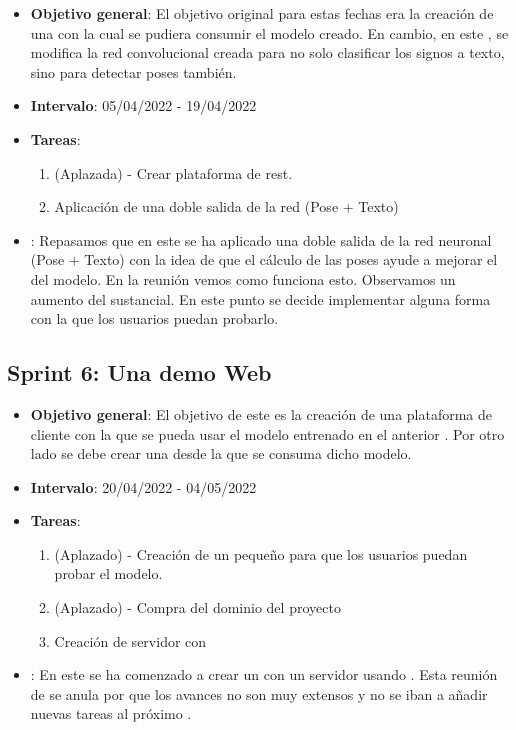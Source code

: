 \begin{itemize}
  \item  \textbf{Objetivo general}: El objetivo original para estas fechas era la creación de una   con la cual se pudiera consumir el modelo creado. En cambio, en este , se modifica la red convolucional creada para no solo clasificar los signos a texto, sino para detectar poses también.

  \item \textbf{Intervalo}: 05/04/2022 - 19/04/2022

  \item \textbf{Tareas}:
        \begin{enumerate}
          \item (Aplazada) - Crear plataforma de  rest.
          \item Aplicación de una doble salida de la red (Pose + Texto)
        \end{enumerate}

  \item \textbf{}: Repasamos que en este  se ha aplicado una doble salida de la red neuronal (Pose + Texto) con la idea de que el cálculo de las poses ayude a mejorar el  del modelo. En la reunión vemos como funciona esto. Observamos un aumento del  sustancial. En este punto se decide implementar alguna forma con la que los usuarios puedan probarlo.
\end{itemize}

\subsection{Sprint 6: Una demo Web}

\begin{itemize}
  \item  \textbf{Objetivo general}: El objetivo de este  es la creación de una plataforma de cliente con la que se pueda usar el modelo entrenado en el anterior . Por otro lado se debe crear una  desde la que se consuma dicho modelo.

  \item \textbf{Intervalo}: 20/04/2022 - 04/05/2022

  \item \textbf{Tareas}:
        \begin{enumerate}
          \item (Aplazado) - Creación de un pequeño  para que los usuarios puedan probar el modelo.
          \item (Aplazado) - Compra del dominio del proyecto
          \item Creación de servidor con  
        \end{enumerate}

  \item \textbf{}: En este  se ha comenzado a crear un  con un servidor usando . Esta reunión de  se anula por que los avances no son muy extensos y no se iban a añadir nuevas tareas al próximo .
\end{itemize}

